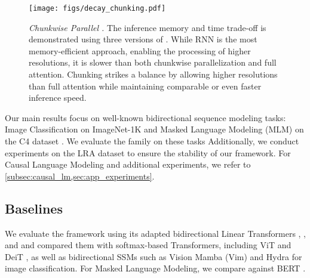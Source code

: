 \begin{figure}[t] 
    \centering
    \texttt{[image: figs/decay\_chunking.pdf]}
    \vspace{-1mm}
  \caption{ %
  \textit{Chunkwise Parallel \lionretnet.} 
  The inference memory and time trade-off is demonstrated using three versions of \lionretnet. While RNN is the most memory-efficient approach, enabling the processing of higher resolutions, it is slower than both chunkwise parallelization and full attention. 
  Chunking strikes a balance by allowing higher resolutions than full attention while maintaining comparable or even faster inference speed.
  } \vspace{-7mm}
  \label{fig:chunking_decay_fig}
\end{figure}


Our main results focus on well-known bidirectional sequence modeling tasks: Image Classification on ImageNet-1K \cite{russakovsky2015imagenet} and Masked Language Modeling (MLM) on the C4 dataset \cite{dodge2021c4}. We evaluate the \lion family on these tasks %
Additionally, we conduct %
experiments on %
the LRA dataset to ensure the stability of our framework. For Causal Language Modeling and additional experiments, we refer to \cref{subsec:causal_lm,sec:app_experiments}.%
\vspace{-1mm}
\subsection{Baselines}
We evaluate the \lion framework using its adapted bidirectional Linear Transformers \lions, \lionretnet, and \lionlit and compared them with softmax-based Transformers, including ViT \cite{vit} and DeiT \cite{deit}, as well as bidirectional SSMs such as Vision Mamba (Vim) \cite{zhu2024visionmambaefficientvisual} and Hydra \cite{hwang2024hydrabidirectionalstatespace} for image classification. For Masked Language Modeling, we compare \lion against BERT \cite{fu2023monarch}.



